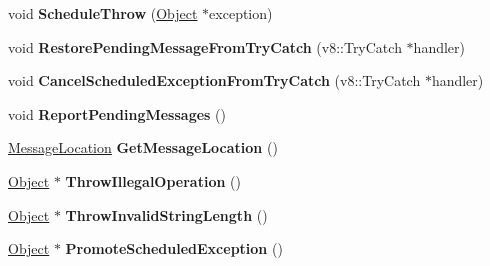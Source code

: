 \begin{DoxyCompactItemize}
\item 
\hypertarget{classv8_1_1internal_1_1_isolate_a6d92f29b935a66b2dfd1ba29d61bdb4c}{}void {\bfseries Schedule\+Throw} (\hyperlink{classv8_1_1internal_1_1_object}{Object} $\ast$exception)\label{classv8_1_1internal_1_1_isolate_a6d92f29b935a66b2dfd1ba29d61bdb4c}

\item 
\hypertarget{classv8_1_1internal_1_1_isolate_a00200c36d3b121d71867d3e0df34d500}{}void {\bfseries Restore\+Pending\+Message\+From\+Try\+Catch} (v8\+::\+Try\+Catch $\ast$handler)\label{classv8_1_1internal_1_1_isolate_a00200c36d3b121d71867d3e0df34d500}

\item 
\hypertarget{classv8_1_1internal_1_1_isolate_a6a66af297d92704cc10c86fd28278b18}{}void {\bfseries Cancel\+Scheduled\+Exception\+From\+Try\+Catch} (v8\+::\+Try\+Catch $\ast$handler)\label{classv8_1_1internal_1_1_isolate_a6a66af297d92704cc10c86fd28278b18}

\item 
\hypertarget{classv8_1_1internal_1_1_isolate_a9f24ef8c59fe3358df12e3310d03df08}{}void {\bfseries Report\+Pending\+Messages} ()\label{classv8_1_1internal_1_1_isolate_a9f24ef8c59fe3358df12e3310d03df08}

\item 
\hypertarget{classv8_1_1internal_1_1_isolate_aa250e39eefa86b3541a9aad23f46a15f}{}\hyperlink{classv8_1_1internal_1_1_message_location}{Message\+Location} {\bfseries Get\+Message\+Location} ()\label{classv8_1_1internal_1_1_isolate_aa250e39eefa86b3541a9aad23f46a15f}

\item 
\hypertarget{classv8_1_1internal_1_1_isolate_a1d294e4525d768e83637f9f49e76d9ee}{}\hyperlink{classv8_1_1internal_1_1_object}{Object} $\ast$ {\bfseries Throw\+Illegal\+Operation} ()\label{classv8_1_1internal_1_1_isolate_a1d294e4525d768e83637f9f49e76d9ee}

\item 
\hypertarget{classv8_1_1internal_1_1_isolate_ab92d869fd86ac4088457e6b7d89044c6}{}\hyperlink{classv8_1_1internal_1_1_object}{Object} $\ast$ {\bfseries Throw\+Invalid\+String\+Length} ()\label{classv8_1_1internal_1_1_isolate_ab92d869fd86ac4088457e6b7d89044c6}

\item 
\hypertarget{classv8_1_1internal_1_1_isolate_acf696e718d6b6d349ef51a5d6e890042}{}\hyperlink{classv8_1_1internal_1_1_object}{Object} $\ast$ {\bfseries Promote\+Scheduled\+Exception} ()\label{classv8_1_1internal_1_1_isolate_acf696e718d6b6d349ef51a5d6e890042}


\end{DoxyCompactItemize}

